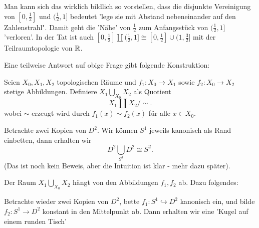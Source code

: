 \begin{remark*}
    Man kann sich das wirklich bildlich so vorstellen, dass die disjunkte Vereinigung von $[0,\frac{1}{2}]$ und $(\frac{1}{2},1]$ bedeutet 'lege sie mit Abstand nebeneinander auf den Zahlenstrahl". Damit geht die 'Nähe' von $\frac{1}{2}$ zum Anfangsstück von $(\frac{1}{2},1]$ 'verloren'. In der Tat ist auch $[0,\frac{1}{2}] \coprod (\frac{1}{2},1] \cong [0,\frac{1}{2}] \cup (1,\frac{3}{2}]$ mit der Teilraumtopologie von $\mathbb{R}$.
\end{remark*}
Eine teilweise Antwort auf obige Frage gibt folgende Konstruktion:
\begin{definition}\label{def:koprodukt-über-basisraum}
    Seien $X_0,X_1,X_2$ topologischen Räume und $f_1: X_0 \to  X_1$ sowie $f_2 : X_0 \to X_2$ stetige Abbildungen. Definiere $X_1 \bigcup\limits_{X_0} X_2$ als Quotient 
    \[
    X_1 \coprod X_2 / \sim 
    .\] 
    wobei $\sim $ erzeugt wird durch $f_1(x) \sim f_2(x)$ für alle $x\in X_0$.
\end{definition}
\begin{example}
    Betrachte zwei Kopien von $D^2$. Wir können $S^1$ jeweils kanonisch als Rand einbetten, dann erhalten wir
     \[
    D^2 \bigcup_{S^1}D^2 \cong S^2 
    .\] 
    (Das ist noch kein Beweis, aber die Intuition ist klar - mehr dazu später).
\end{example}
\begin{warning}
    Der Raum $X_1\bigcup\limits_{X_0} X_2$ hängt von den Abbildungen $f_1,f_2$ ab. Dazu folgendes:
\end{warning}
\begin{example}
    Betrachte wieder zwei Kopien von $D^2$, bette $f_1: S^1 \hookrightarrow  D^2$ kanonisch ein, und bilde $f_2: S^1 \to  D^2$ konstant in den Mittelpunkt ab. Dann erhalten wir eine 'Kugel auf einem runden Tisch'
    \begin{minipage}{\textwidth}
    \end{minipage}
\end{example}

